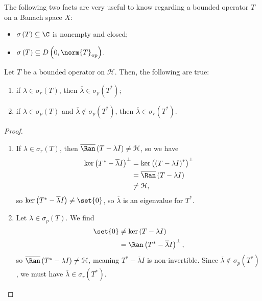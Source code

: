 \documentclass[10pt]{mypackage}
\begin{document}
The following two facts are very useful to know regarding a bounded operator $T$ on a Banach space $X$:
\begin{itemize}
  \item $\sigma\left(T\right)\subseteq \C$ is nonempty and closed;
  \item $\sigma\left(T\right) \subseteq D\left(0,\norm{T}_{\text{op}}\right)$.
\end{itemize}
\begin{lemma}
  Let $T$ be a bounded operator on $\mathcal{H}$. Then, the following are true:
  \begin{enumerate}[(1)]
    \item if $\lambda\in \sigma_r\left(T\right)$, then $\overline{\lambda}\in \sigma_p\left(T^{\ast}\right)$;
    \item if $\lambda \in \sigma_p\left(T\right)$ and $\overline{\lambda}\notin \sigma_p\left(T^{\ast}\right)$, then $\overline{\lambda}\in \sigma_r\left(T^{\ast}\right)$.
  \end{enumerate}
\end{lemma}
\begin{proof}\hfill
  \begin{enumerate}[(1)]
    \item If $\lambda\in \sigma_r\left(T\right)$, then $\overline{\Ran}\left(T - \lambda I\right) \neq \mathcal{H}$, so we have
      \begin{align*}
        \ker\left(T^{\ast} - \overline{\lambda}I\right)^{\perp} &= \ker\left(\left(T-  \lambda I\right)^{\ast}\right)^{\perp}\\
                                                                &= \overline{\Ran}\left(T - \lambda I\right)\\
                                                                &\neq \mathcal{H},
      \end{align*}
      so $\ker\left(T^{\ast} - \overline{\lambda}I\right)\neq \set{0}$, so $\overline{\lambda}$ is an eigenvalue for $T^{\ast}$.
    \item Let $\lambda\in \sigma_p\left(T\right)$. We find
      \begin{align*}
        \set{0} &\neq \ker\left(T - \lambda I\right)\\
                &= \Ran\left(T^{\ast} - \overline{\lambda}I\right)^{\perp},
      \end{align*}
      so $\overline{\Ran}\left(T^{\ast} - \lambda I\right) \neq \mathcal{H}$, meaning $T^{\ast} - \overline{\lambda}I$ is non-invertible. Since $\overline{\lambda}\notin \sigma_p\left(T^{\ast}\right)$, we must have $\overline{\lambda}\in \sigma_r\left(T^{\ast}\right)$.
  \end{enumerate}
\end{proof}
\end{document}
